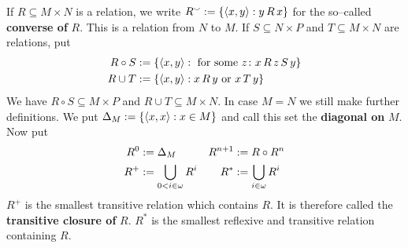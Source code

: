 If $R \subseteq M \times N$ is a relation, we write
$R^{\smallsmile} := \{\langle x, y\rangle : y\, R\, x\}$ for the
so--called \textbf{converse of} $R$. This is a relation from
$N$ to $M$. If $S \subseteq N \times P$ and $T \subseteq M \times N$
are relations, put
\begin{align}
R \circ S & := \{\langle x,y\rangle : \text{ for some } 
	z\colon x\, R\, z \, S\, y\} \\\notag
R \cup T  & := \{\langle x,y\rangle : x \, R\, y \text{ or } x \, T\, y\}
\end{align}
We have $R \circ S \subseteq M \times P$ and $R \cup T \subseteq
M \times N$. In case $M = N$ we still make further definitions.
We put $\Delta_M := \{\langle x,x\rangle : x \in M\}$ and call this set
the \textbf{diagonal on} $M$. Now put
\begin{align}
R^0      & := \Delta_M & R^{n+1}  & := R \circ R^n \\\notag
R^+      & := \bigcup_{0 < i \in \omega} R^i & R^{\ast} 
& := \bigcup_{i \in \omega} R^i
\end{align}
$R^+$ is the smallest transitive relation which contains $R$.
It is therefore called the \textbf{transitive closure of} $R$.
$R^{\ast}$ is the smallest reflexive and transitive relation
containing $R$.

